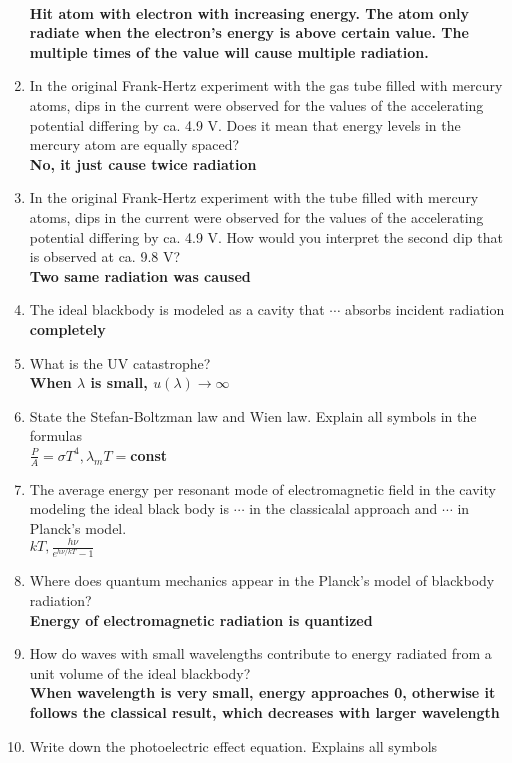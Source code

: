 \documentclass[a4paper]{article}
\begin{document}
\begin{enumerate}
    \\ \textbf{Hit atom with electron with increasing energy. The atom only radiate when the electron's energy is above certain value. The multiple times of the value will cause multiple radiation.}
    \item In the original Frank-Hertz experiment with the gas tube filled with mercury atoms, dips in the current were observed for the values of the accelerating potential differing by ca. 4.9 V. Does it mean that energy levels in the mercury atom are equally spaced?
    \\ \textbf{No, it just cause twice radiation}
    \item In the original Frank-Hertz experiment with the tube filled with mercury atoms, dips in the current were observed for the values of the accelerating potential differing by ca. 4.9 V. How would you interpret the second dip that is observed at ca. 9.8 V?
    \\ \textbf{Two same radiation was caused}
    \item The ideal blackbody is modeled as a cavity that $\cdots$ absorbs incident radiation
    \\ \textbf{completely}
    \item What is the UV catastrophe?
    \\ \textbf{When $\lambda$ is small, $u(\lambda)\rightarrow\infty$}
    \item State the Stefan-Boltzman law and Wien law. Explain all symbols in the formulas
    \\ \textbf{$\frac{P}{A}=\sigma T^4,\lambda_mT=$const}
    \item The average energy per resonant mode of electromagnetic field in the cavity modeling the ideal
    black body is $\cdots$ in the classicalal approach and $\cdots$ in Planck’s model.
    \\ \textbf{$kT,\frac{h\nu}{e^{h\nu/kT}-1}$}
    \item Where does quantum mechanics appear in the Planck’s model of blackbody radiation?
    \\ \textbf{Energy of electromagnetic radiation is quantized}
    \item How do waves with small wavelengths contribute to energy radiated from a unit volume of the ideal blackbody?
    \\ \textbf{When wavelength is very small, energy approaches 0, otherwise it follows the classical result, which decreases with larger wavelength}
    \item Write down the photoelectric effect equation. Explains all symbols

\end{enumerate}
\end{document}
